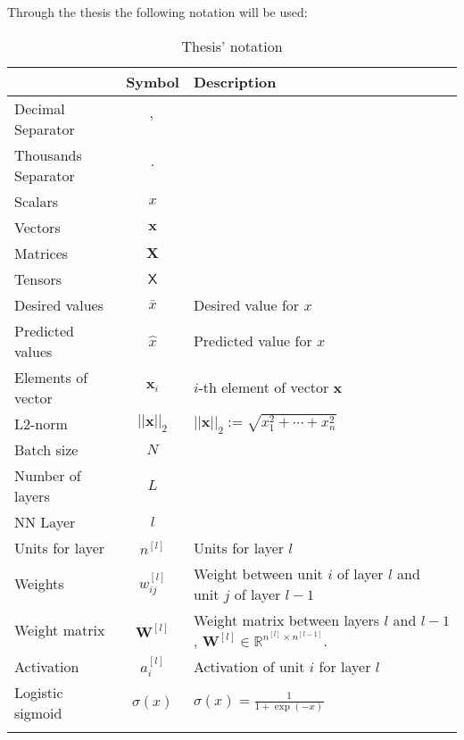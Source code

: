 
{}

Through the thesis the following notation will be used:


\renewcommand*{\arraystretch}{2}
\begin{longtable}{l|c|p{6cm}}
    & \textbf{Symbol} & \textbf{Description} \\
  \hline\hline
  \endhead
  
  Decimal Separator & \( , \) & \\
  Thousands Separator & \( . \) & \\
  Scalars & \( x \) & \\
  Vectors & \( \bm{x} \) & \\
  Matrices & \(\bm{X}\) & \\
  Tensors & \( \bm{\mathsf{X}} \) & \\
  Desired values & \( \bar{x} \) & Desired value for \( x \) \\
  Predicted values & \( \hat{x} \) & Predicted value for \( x \) \\
  Elements of vector & \( \bm{x}_i \) & \( i \)-th element of vector \( \bm{x} \) \\
  L2-norm & \( ||\bm{x}||_2 \) &  \( ||\bm{x}||_2 := \sqrt{x_1^2 + \cdots + x_n^2} \) \\
  \hline
  Batch size & \( N \) & \\
  Number of layers & \( L \) & \\
  NN Layer & \( l \) & \\
  Units for layer & \( n^{[l]} \) & Units for layer \( l \) \\
  Weights & \( w_{ij}^{[l]} \) & Weight between unit \( i \) of layer \( l \) and unit
  \( j \) of layer \( l - 1 \) \\
  Weight matrix & \( \bm{W}^{[l]} \) & Weight 
  matrix between layers \( l \) and \( l - 1 \), 
  \( \bm{W}^{[l]} \in \mathbb{R}^{n^{[l]} \times n^{[l - 1]}} \). \\
  Activation & \( a_i^{[l]} \) & Activation of unit \( i \) for layer \( l \) \\
  Logistic sigmoid & \( \sigma(x) \) & \( \displaystyle \sigma(x) = \frac{1}{1 + \exp(-x)} \) \\
  \caption{Thesis' notation}
\end{longtable}

